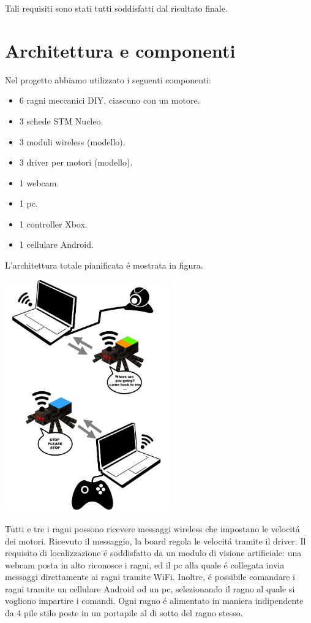 \documentclass [11pt ,a4paper ,twoside ]{article}
\begin{document}
Tali requisiti sono stati tutti soddisfatti dal risultato finale.

\section{Architettura e componenti}

Nel progetto abbiamo utilizzato i seguenti componenti:
\begin{itemize}
\item 6 ragni meccanici DIY, ciascuno con un motore.
\item 3 schede STM Nucleo.
\item 3 moduli wireless (modello).
\item 3 driver per motori (modello).
\item 1 webcam.
\item 1 pc.
\item 1 controller Xbox.
\item 1 cellulare Android.
\end{itemize}

L'architettura totale pianificata \'e mostrata in figura. 

\begin{center}
\includegraphics[keepaspectratio, width=200pt]{Images/Infographic.png}
\end{center}

Tutti e tre i ragni possono ricevere messaggi wireless che impostano le velocit\'a dei motori. Ricevuto il messaggio, la board regola le velocit\'a tramite il driver. Il requisito di localizzazione \'e soddisfatto da un modulo di visione artificiale: una webcam posta in alto riconosce i ragni, ed il pc alla quale \'e collegata invia messaggi direttamente ai ragni tramite WiFi. Inoltre, \'e possibile comandare i ragni tramite un cellulare Android od un pc, selezionando il ragno al quale si vogliono impartire i comandi. Ogni ragno \'e alimentato in maniera indipendente da 4 pile stilo poste in un portapile al di sotto del ragno stesso.
\end{document}
